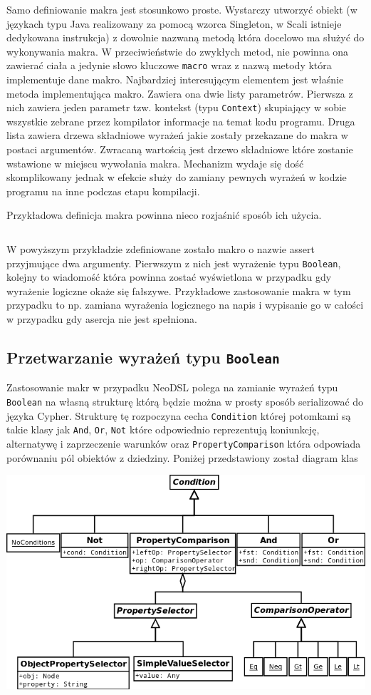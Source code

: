 \documentclass[brudnopis]{xmgr}
\begin{document}
Samo definiowanie makra jest stosunkowo proste. Wystarczy utworzyć obiekt (w językach typu Java realizowany za pomocą wzorca Singleton, w Scali istnieje dedykowana instrukcja) z dowolnie nazwaną metodą która docelowo ma służyć do wykonywania makra. W przeciwieństwie do zwykłych metod, nie powinna ona zawierać ciała a jedynie słowo kluczowe \texttt{macro} wraz z nazwą metody która implementuje dane makro. Najbardziej interesującym elementem jest właśnie metoda implementująca makro. Zawiera ona dwie listy parametrów. Pierwsza z nich zawiera jeden parametr tzw. kontekst (typu \texttt{Context}) skupiający w sobie wszystkie zebrane przez kompilator informacje na temat kodu programu. Druga lista zawiera drzewa składniowe wyrażeń jakie zostały przekazane do makra w postaci argumentów. Zwracaną wartością jest drzewo składniowe które zostanie wstawione w miejscu wywołania makra. Mechanizm wydaje się dość skomplikowany jednak w efekcie służy do zamiany pewnych wyrażeń w kodzie programu na inne podczas etapu kompilacji.

Przykładowa definicja makra powinna nieco rozjaśnić sposób ich użycia.

\inputminted{scala}{listings/scala/macro-sample.scala}

W powyższym przykładzie zdefiniowane zostało makro o nazwie assert przyjmujące dwa argumenty. Pierwszym z nich jest wyrażenie typu \texttt{Boolean}, kolejny to wiadomość która powinna zostać wyświetlona w przypadku gdy wyrażenie logiczne okaże się fałszywe. Przykładowe zastosowanie makra w tym przypadku to np. zamiana wyrażenia logicznego na napis i wypisanie go w całości w przypadku gdy asercja nie jest spełniona.

\subsection{Przetwarzanie wyrażeń typu \texttt{Boolean}}

Zastosowanie makr w przypadku NeoDSL polega na zamianie wyrażeń typu \texttt{Boolean} na własną strukturę którą będzie można w prosty sposób serializować do języka Cypher. 
Strukturę tę rozpoczyna cecha \texttt{Condition} której potomkami są takie klasy jak \texttt{And}, \texttt{Or}, \texttt{Not} które odpowiednio reprezentują koniunkcję, alternatywę i zaprzeczenie warunków oraz \texttt{PropertyComparison} która odpowiada porównaniu pól obiektów z dziedziny. Poniżej przedstawiony został diagram klas

\includegraphics[scale=0.5]{images/conditions-uml.png}
\end{document}
